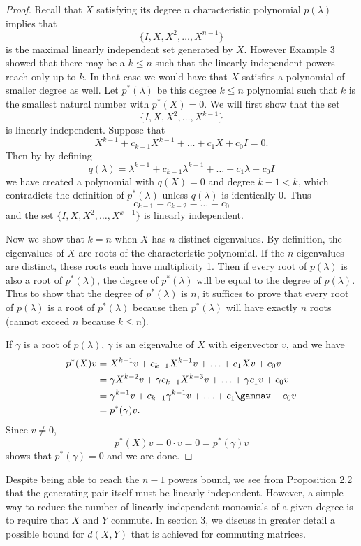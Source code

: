 \documentclass[11pt]{amsart}
\numberwithin{equation}{section}
\numberwithin{figure}{section}
\numberwithin{theorem}{section}
\begin{document}
\begin{proof}
Recall that $X$ satisfying its degree $n$ characteristic polynomial $p(\lambda)$ implies that $$\{I,X,X^2,\ldots,X^{n-1}\}$$ is the maximal linearly independent set generated by $X$. However Example 3 showed that there may be a $k\leq n$ such that the linearly independent powers reach only up to $k$. In that case we would have that $X$ satisfies a polynomial of smaller degree as well. Let $p^*(\lambda)$ be this degree $k\leq n$ polynomial such that $k$ is the smallest natural number with $p^*(X)=0$. We will first show that the set $$\{I,X,X^2,\ldots,X^{k-1}\}$$ is linearly independent. Suppose that $$X^{k-1}+c_{k-1}X^{k-1}+\ldots+c_1X+c_0I=0.$$ Then by by defining $$q(\lambda)=\lambda^{k-1}+c_{k-1}\lambda^{k-1}+\ldots+c_1\lambda+c_0I$$ we have created a polynomial with $q(X)=0$ and degree $k-1<k$, which contradicts the definition of $p^*(\lambda)$ unless $q(\lambda)$ is identically 0. Thus $$c_{k-1}=c_{k-2}=\ldots=c_0$$ and the set $\{I,X,X^2,\ldots,X^{k-1}\}$ is linearly independent. 

Now we show that $k=n$ when $X$ has $n$ distinct eigenvalues. By definition, the eigenvalues of $X$ are roots of the characteristic polynomial. If the $n$ eigenvalues are distinct, these roots each have multiplicity 1. Then if every root of $p(\lambda)$ is also a root of $p^*(\lambda)$, the degree of $p^*(\lambda)$ will be equal to the degree of $p(\lambda)$. Thus to show that the degree of $p^*(\lambda)$ is $n$, it suffices to prove that every root of $p(\lambda)$ is a root of $p^*(\lambda)$ because then $p^*(\lambda)$ will have exactly $n$ roots (cannot exceed $n$ because $k\leq n$). 

If $\gamma$ is a root of $p(\lambda)$, $\gamma$ is an eigenvalue of $X$ with eigenvector $v$, and we have 
\begin{equation*}
    \begin{split}
      p^*(X)v&=X^{k-1}v+c_{k-1}X^{k-1}v+\ldots+c_1Xv+c_0v \\
      &=\gamma X^{k-2}v+\gamma c_{k-1}X^{k-3}v+\ldots+\gamma c_1v+c_0v\\
      &=\gamma^{k-1}v+c_{k-1}\gamma^{k-1}v+\ldots+c_1\gammav+c_0v\\
      &=p^*(\gamma)v.
    \end{split}
\end{equation*}
Since $v\neq0$,  $$p^*(X)v=0\cdot v=0=p^*(\gamma)v$$ shows that $p^*(\gamma)=0$ and we are done.  
\end{proof}
Despite being able to reach the $n-1$ powers bound, we see from Proposition 2.2 that the generating pair itself must be linearly independent. However, a simple way to reduce the number of linearly independent monomials of a given degree is to require that $X$ and $Y$ commute. In section 3, we discuss in greater detail a possible bound for $d(X,Y)$ that is achieved for commuting matrices. 
\end{document}
